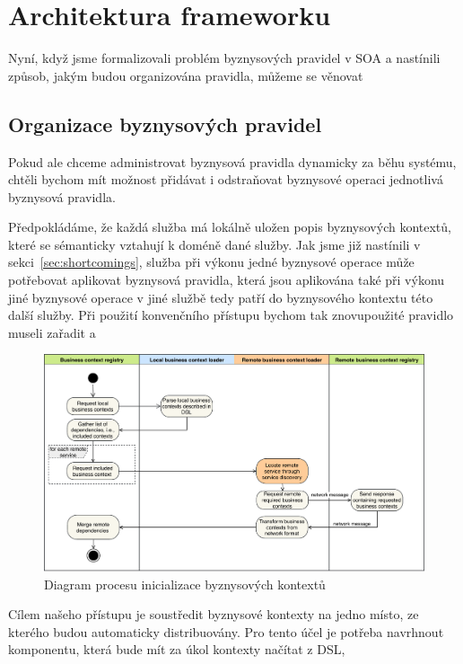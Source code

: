 \section{Architektura frameworku}

Nyní, když jsme formalizovali problém byznysových pravidel v \gls{SOA} a nastínili způsob,
jakým budou organizována pravidla, můžeme se věnovat

\subsection{Organizace byznysových pravidel}

Pokud ale chceme administrovat byznysová pravidla dynamicky za běhu systému, chtěli bychom mít možnost
přidávat i odstraňovat byznysové operaci jednotlivá byznysová pravidla.


Předpokládáme, že každá služba má lokálně uložen popis byznysových kontextů, které se sémanticky vztahují
k doméně dané služby. Jak jsme již nastínili v sekci~\ref{sec:shortcomings}, služba při výkonu jedné byznysové
operace může potřebovat aplikovat byznysová pravidla, která jsou aplikována také při výkonu jiné byznysové operace
v jiné službě \textendash\xspace tedy patří do byznysového kontextu této další služby. Při použití konvenčního
přístupu bychom tak znovupoužité pravidlo museli zařadit a

\begin{figure}
    \centering
    \includegraphics[keepaspectratio=true, width=0.8\linewidth]{figures/business-context-loading.pdf}
    \caption{Diagram procesu inicializace byznysov\'ych kontextů}
    \label{fig:business-context-loading}
\end{figure} %

Cílem našeho přístupu je soustředit byznysové kontexty na jedno místo, ze kterého budou
automaticky distribuovány. Pro tento účel je potřeba navrhnout komponentu, která bude mít
za úkol kontexty načítat z \gls{DSL}, 

